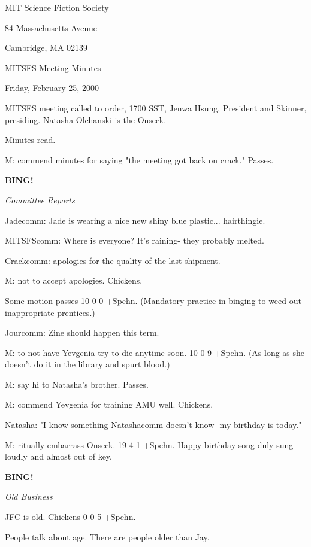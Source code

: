 \documentclass[12pt]{article}
\newcommand{\bing}{{\bf BING!} }
\newcommand{\goto}[1]{\bing \vskip 12pt \centerline{{\em{#1}}}}
\begin{document}
\begin{center}

MIT Science Fiction Society 

84 Massachusetts Avenue

Cambridge, MA 02139

\vspace{12pt}

MITSFS Meeting Minutes 

Friday, February 25, 2000

\end{center}
 
\vspace{18pt}

\setlength{\parskip}{6pt}

\noindent
MITSFS meeting called to order, 1700 SST, Jenwa Hsung, President and
Skinner, presiding.  Natasha Olchanski is the Onseck.

Minutes read.

M: commend minutes for saying "the meeting got back on crack." Passes.

\goto{Committee Reports}

Jadecomm: Jade is wearing a nice new shiny blue plastic... hairthingie.

MITSFScomm: Where is everyone? It's raining- they probably melted.

Crackcomm: apologies for the quality of the last shipment.

M: not to accept apologies. Chickens.

Some motion passes 10-0-0 +Spehn. (Mandatory practice in binging to weed out inappropriate prentices.)

Jourcomm: Zine should happen this term.

M: to not have Yevgenia try to die anytime soon. 10-0-9 +Spehn. (As long as she doesn't do it in the library and spurt blood.)

M: say hi to Natasha's brother. Passes.

M: commend Yevgenia for training AMU well. Chickens.

Natasha: "I know something Natashacomm doesn't know- my birthday is today."

M: ritually embarrass Onseck. 19-4-1 +Spehn. Happy birthday song duly sung loudly and almost out of key.

\goto{Old Business}

JFC is old. Chickens 0-0-5 +Spehn.

People talk about age. There are people older than Jay.
\end{document}
